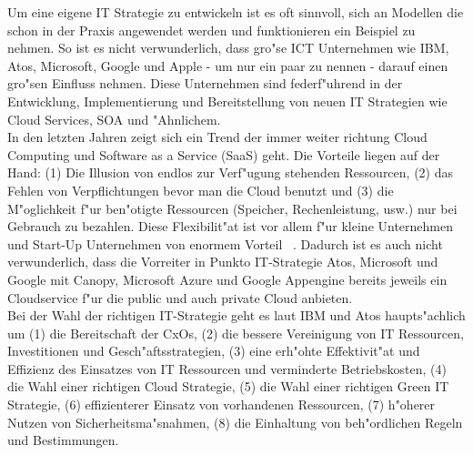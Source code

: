 Um eine eigene IT Strategie zu entwickeln ist es oft sinnvoll, sich an Modellen die schon in der Praxis angewendet werden und funktionieren ein Beispiel zu nehmen. So ist es nicht verwunderlich, dass gro"se ICT Unternehmen wie IBM, Atos, Microsoft, Google und Apple - um nur ein paar zu nennen - darauf einen gro"sen Einfluss nehmen. Diese Unternehmen sind federf"uhrend in der Entwicklung, Implementierung und Bereitstellung von neuen IT Strategien wie Cloud Services, SOA und "Ahnlichem.\\

In den letzten Jahren zeigt sich ein Trend der immer weiter richtung Cloud Computing und Software as a Service (SaaS) geht. Die Vorteile liegen auf der Hand: (1) Die Illusion von endlos zur Verf"ugung stehenden Ressourcen, (2) das Fehlen von Verpflichtungen bevor man die Cloud benutzt und (3) die M"oglichkeit f"ur ben"otigte Ressourcen (Speicher, Rechenleistung, usw.) nur bei Gebrauch zu bezahlen. Diese Flexibilit"at ist vor allem f"ur kleine Unternehmen und Start-Up Unternehmen von enormem Vorteil ~\cite{Armbrust2009}. Dadurch ist es auch nicht verwunderlich, dass die Vorreiter in Punkto IT-Strategie Atos, Microsoft und Google mit Canopy, Microsoft Azure und Google Appengine bereits jeweils ein Cloudservice f"ur die public und auch private Cloud anbieten.\\

Bei der Wahl der richtigen IT-Strategie geht es laut IBM und Atos haupts"achlich um (1) die Bereitschaft der CxOs, (2) die bessere Vereinigung von IT Ressourcen, Investitionen und Gesch"aftsstrategien, (3) eine erh"ohte Effektivit"at und Effizienz des Einsatzes von IT Ressourcen und verminderte Betriebskosten, (4) die Wahl einer richtigen Cloud Strategie, (5) die Wahl einer richtigen Green IT Strategie, (6) effizienterer Einsatz von vorhandenen Ressourcen, (7) h"oherer Nutzen von Sicherheitsma"snahmen, (8) die Einhaltung von beh"ordlichen Regeln und Bestimmungen.

